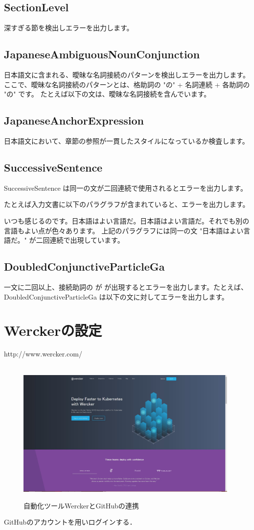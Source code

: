 \subsection{SectionLevel}
深すぎる節を検出しエラーを出力します。
\subsection{JapaneseAmbiguousNounConjunction}
日本語文に含まれる、曖昧な名詞接続のパターンを検出しエラーを出力します。 ここで、曖昧な名詞接続のパターンとは、格助詞の "の" + 名詞連続 + 各助詞の "の" です。 たとえば以下の文は、曖昧な名詞接続を含んでいます。
\subsection{JapaneseAnchorExpression}
日本語文において、章節の参照が一貫したスタイルになっているか検査します。
\subsection{SuccessiveSentence}
SuccessiveSentence は同一の文が二回連続で使用されるとエラーを出力します。

たとえば入力文書に以下のパラグラフが含まれていると、エラーを出力します。

いつも感じるのです。日本語はよい言語だ。日本語はよい言語だ。それでも別の言語もよい点が色々あります。
上記のパラグラフには同一の文 "日本語はよい言語だ。" が二回連続で出現しています。
\subsection{DoubledConjunctiveParticleGa}
一文に二回以上、接続助詞の が が出現するとエラーを出力します。たとえば、DoubledConjunctiveParticleGa は以下の文に対してエラーを出力します。


\newpage
\section{Werckerの設定}
http://www.wercker.com/
\begin{figure}[htb]
\centering　
\includegraphics[width=11cm]{13.JPG}
\caption{自動化ツールWerckerとGitHubの連携}\label{tab:uac}
\end{figure}
GitHubのアカウントを用いログインする．

